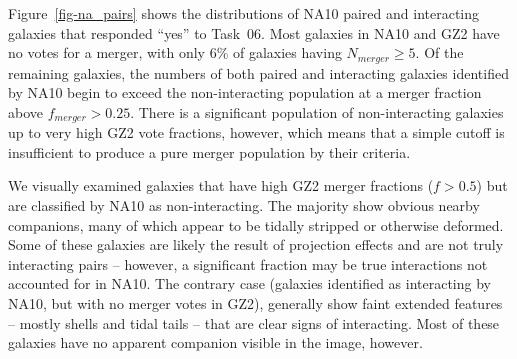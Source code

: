 \documentclass[useAMS,usenatbib]{mn2e}
\begin{document}
Figure~\ref{fig-na_pairs} shows the distributions of NA10 paired and interacting galaxies that responded ``yes'' to Task~06. Most galaxies in NA10 and GZ2 have no votes for a merger, with only 6\% of galaxies having $N_{merger}\ge5$. Of the remaining galaxies, the numbers of both paired and interacting galaxies identified by NA10 begin to exceed the non-interacting population at a merger fraction above $f_{merger}>0.25$. There is a significant population of non-interacting galaxies up to very high GZ2 vote fractions, however, which means that a simple cutoff is insufficient to produce a pure merger population by their criteria. 

We visually examined galaxies that have high GZ2 merger fractions ($f>0.5$) but are classified by NA10 as non-interacting. The majority show obvious nearby companions, many of which appear to be tidally stripped or otherwise deformed. Some of these galaxies are likely the result of projection effects and are not truly interacting pairs -- however, a significant fraction may be true interactions not accounted for in NA10. The contrary case (galaxies identified as interacting by NA10, but with no merger votes in GZ2), generally show faint extended features -- mostly shells and tidal tails -- that are clear signs of interacting. Most of these galaxies have no apparent companion visible in the image, however.

%
%
\end{document}
